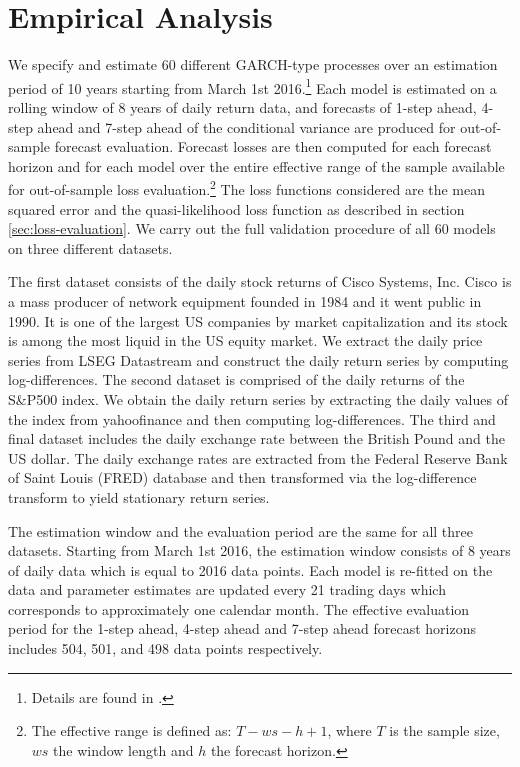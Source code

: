\documentclass{article} %
\begin{document}
	\section{Empirical Analysis}\label{sec:empirical}
	We specify and estimate 60 different GARCH-type processes over an estimation period of 10 years starting from March 1st 2016.\footnote{Details are found in \textcite{GITHUB}.} Each model is estimated on a rolling window of 8 years of daily return data, and forecasts of 1-step ahead, 4-step ahead and 7-step ahead of the conditional variance are produced for out-of-sample forecast evaluation. Forecast losses are then computed for each forecast horizon and for each model over the entire effective range of the sample available for out-of-sample loss evaluation.\footnote{The effective range is defined as: $T - ws - h + 1$, where $T$ is the sample size, $ws$ the window length and $h$ the forecast horizon.} The loss functions considered are the mean squared error and the quasi-likelihood loss function as described in section \ref{sec:loss-evaluation}. We carry out the full validation procedure of all 60 models on three different datasets.
	
	The first dataset consists of the daily stock returns of Cisco Systems, Inc. Cisco is a mass producer of network equipment founded in 1984 and it went public in 1990. It is one of the largest US companies by market capitalization and its stock is among the most liquid in the US equity market. We extract the daily price series from LSEG Datastream and construct the daily return series by computing log-differences. The second dataset is comprised of the daily returns of the S\&P500 index. We obtain the daily return series by extracting the daily values of the index from yahoofinance and then computing log-differences. The third and final dataset includes the daily exchange rate between the British Pound and the US dollar. The daily exchange rates are extracted from the Federal Reserve Bank of Saint Louis (FRED) database and then transformed via the log-difference transform to yield stationary return series.
	
	The estimation window and the evaluation period are the same for all three datasets. Starting from March 1st 2016, the estimation window consists of 8 years of daily data which is equal to 2016 data points. Each model is re-fitted on the data and parameter estimates are updated every 21 trading days which corresponds to approximately one calendar month. The effective evaluation period for the 1-step ahead, 4-step ahead and 7-step ahead forecast horizons includes 504, 501, and 498 data points respectively.
	
\end{document}
